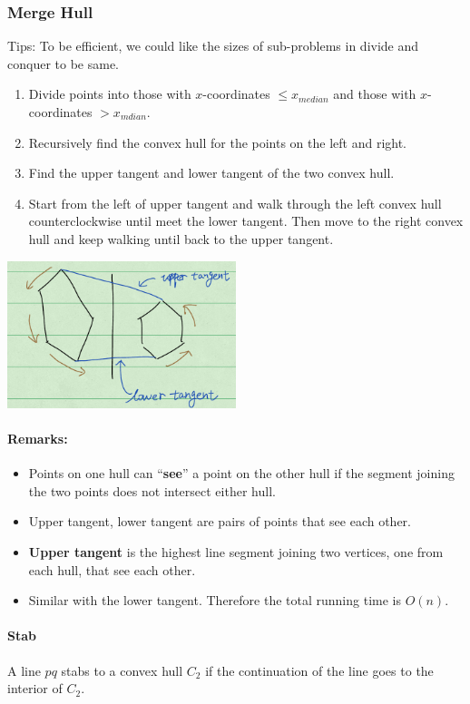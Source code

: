 \subsubsection{Merge Hull}
Tips: To be efficient, we could like the sizes of sub-problems in divide and 
conquer to be same.
\begin{enumerate}
 \item Divide points into those with $x$-coordinates $\le x_{median}$ and those 
with $x$-coordinates $> x_{mdian}$.
\item Recursively find the convex hull for the points on the left and right.
\item Find the upper tangent and lower tangent of the two convex hull. 
\item Start from the left of upper tangent and walk through the left convex 
hull counterclockwise until meet the lower tangent. Then move to the right 
convex hull and keep walking until back to the upper tangent.
\end{enumerate}
\centerline{\includegraphics[width=0.5\textwidth]{tangent.png}}

\paragraph{Remarks:}
\begin{itemize}
\item Points on one hull can ``\textbf{see}'' a point on the other hull if the 
segment joining the two points does not intersect either hull.
\item Upper tangent, lower tangent are pairs of points that see each other.
\item \textbf{Upper tangent}  is the highest line segment joining two vertices, 
one from each hull, that see each other.
\item Similar with the lower tangent. Therefore the total running time is 
$O(n)$.
\end{itemize}

\paragraph{Stab}
A line $pq$ stabs to a convex hull $C_2$ if the continuation of the line goes to 
the interior of $C_2$.

